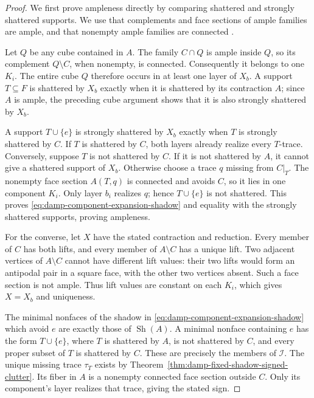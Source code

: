 \begin{proof}
We first prove ampleness directly by comparing shattered and strongly
shattered supports.  We use that complements and face sections of ample
families are ample, and that nonempty ample families are connected
\cite[Theorem~2 and Lemma~1]{Lawrence83}.

Let $Q$ be any cube contained in $A$.  The family $C\cap Q$ is ample
inside $Q$, so its complement $Q\setminus C$, when nonempty, is connected.
Consequently it belongs to one $K_i$.  The entire cube $Q$ therefore
occurs in at least one layer of $X_b$.  A support $T\subseteq F$ is
shattered by $X_b$ exactly when it is shattered by its contraction $A$;
since $A$ is ample, the preceding cube argument shows that it is also
strongly shattered by $X_b$.

A support $T\cup\{e\}$ is strongly shattered by $X_b$ exactly when $T$
is strongly shattered by $C$.  If $T$ is shattered by $C$, both layers
already realize every $T$-trace.  Conversely, suppose $T$ is not shattered
by $C$.  If it is not shattered by $A$, it cannot give a shattered support
of $X_b$.  Otherwise choose a trace $q$ missing from $C|_T$.  The nonempty
face section $A(T,q)$ is connected and avoids $C$, so it lies in one
component $K_i$.  Only layer $b_i$ realizes $q$; hence $T\cup\{e\}$ is
not shattered.  This proves \eqref{eq:damp-component-expansion-shadow}
and equality with the strongly shattered supports, proving ampleness.

For the converse, let $X$ have the stated contraction and reduction.  Every member of $C$ has both lifts, and every member of
$A\setminus C$ has a unique lift.  Two adjacent vertices of
$A\setminus C$ cannot have different lift values: their two lifts would
form an antipodal pair in a square face, with the other two vertices
absent.  Such a face section is not ample.  Thus lift values are constant
on each $K_i$, which gives $X=X_b$ and uniqueness.

The minimal nonfaces of the shadow in
\eqref{eq:damp-component-expansion-shadow} which avoid $e$ are exactly
those of $\operatorname{Sh}(A)$.  A minimal nonface containing $e$ has
the form $T\cup\{e\}$, where $T$ is shattered by $A$, is not shattered
by $C$, and every proper subset of $T$ is shattered by $C$.  These are
precisely the members of $\mathcal I$.  The unique missing trace
$\tau_T$ exists by Theorem~\ref{thm:damp-fixed-shadow-signed-clutter}.
Its fiber in $A$ is a nonempty connected face section outside $C$.
Only its component's layer realizes that trace, giving the stated sign.


\end{proof}
